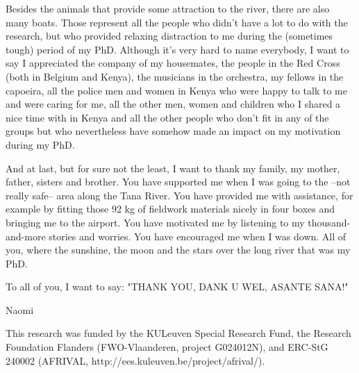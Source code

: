 Besides the animals that provide some attraction to the river, there are also many boats. Those represent all the people who didn't have a lot to do with the research, but who provided relaxing distraction to me during the (sometimes tough) period of my PhD. Although it's very hard to name everybody, I want to say I appreciated the company of my housemates, the people in the Red Cross (both in Belgium and Kenya), the musicians in the orchestra, my fellows in the capoeira, all the police men and women in Kenya who were happy to talk to me and were caring for me, all the other men, women and children who I shared a nice time with in Kenya and all the other people who don't fit in any of the groups but who nevertheless have somehow made an impact on my motivation during my PhD.
\bigskip

And at last, but for sure not the least, I want to thank my family, my mother, father, sisters and brother. You have supported me when I was going to the --not really safe-- area along the Tana River. You have provided me with assistance, for example by fitting those 92 kg of fieldwork materials nicely in four boxes and bringing me to the airport. You have motivated me by listening to my thousand-and-more stories and worries. You have encouraged me when I was down. All of you, where the sunshine, the moon and the stars over the long river that was my PhD.
\bigskip

To all of you, I want to say: "THANK YOU, DANK U WEL, ASANTE SANA!"

Naomi


\vfill
This research was funded by the KULeuven Special Research Fund, the Research Foundation Flanders (FWO-Vlaanderen, project G024012N), and ERC-StG 240002
(AFRIVAL, http://ees.kuleuven.be/project/afrival/).

\cleardoublepage

